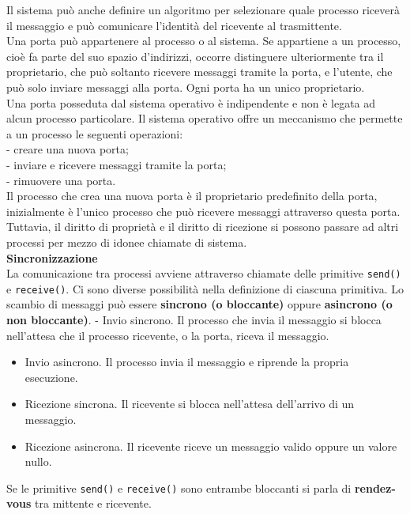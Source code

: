 \documentclass[11pt,a4paper]{article}
\begin{document}
Il sistema può
anche definire un algoritmo per selezionare quale processo riceverà il messaggio
e può comunicare l'identità del ricevente al trasmittente.\medskip\\
%
Una porta può appartenere al processo o al sistema. Se appartiene a un processo, cioè fa par­te del suo spazio d'indirizzi, occorre distinguere ulteriormente tra il proprietario, che può
soltanto ricevere messaggi tramite la porta, e l'utente, che può solo inviare messaggi alla por­ta. Ogni porta ha un unico proprietario.\\
Una porta posseduta dal sistema operativo è indipendente e non è legata
ad alcun processo particolare. Il sistema operativo offre un meccanismo che permette a un
processo le seguenti operazioni:\medskip\\
- creare una nuova porta;\medskip\\
- inviare e ricevere messaggi tramite la porta;\medskip\\
- rimuovere una porta.\medskip\\
Il processo che crea una nuova porta è il proprietario predefinito della porta, inizialmente è
l'unico processo che può ricevere messaggi attraverso questa porta. Tuttavia, il diritto di pro­prietà e il diritto di ricezione si possono passare ad altri processi per mezzo di idonee chia­mate di sistema.\medskip\\
%
\textbf{Sincronizzazione}\\
La comunicazione tra processi avviene attraverso chiamate delle primitive \texttt{send()} e \texttt{receive()}. Ci sono diverse possibilità nella definizione di ciascuna primitiva. Lo scambio
di messaggi può essere \textbf{sincrono (o bloccante)} oppure \textbf{asincrono (o non bloccante)}.
- Invio sincrono. Il processo che invia il messaggio si blocca nell'attesa che il processo ri­cevente, o la porta, riceva il messaggio.
\begin{itemize}[noitemsep, leftmargin=*]
  \item Invio asincrono. Il processo invia il messaggio e riprende la propria esecuzione.
  \item Ricezione sincrona. Il ricevente si blocca nell'attesa dell'arrivo di un messaggio.
  \item Ricezione asincrona. Il ricevente riceve un messaggio valido oppure un valore nullo.
\end{itemize}
%
Se le primitive \texttt{send()} e \texttt{receive()} sono entrambe bloccanti si parla di \textbf{rendez-vous} tra mittente e ricevente.\medskip\\
\end{document}
